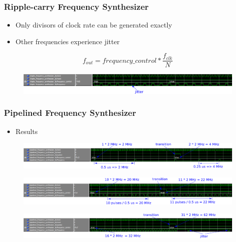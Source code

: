\documentclass{beamer}
\begin{document}
\begin{frame}
\frametitle{Ripple-carry Frequency Synthesizer}

\begin{itemize}
    \item Only divisors of clock rate can be generated exactly
    \item Other frequencies experience jitter
\end{itemize}

\[ f_{out} = frequency\_control * \frac{f_{clk}}{N} \]

\begin{figure}[!htb]
    \centering
    \includegraphics[width=\linewidth]{remainder_jitter.PNG}
\end{figure}

\end{frame}

\begin{frame}
\frametitle{Pipelined Frequency Synthesizer}

\begin{itemize}
    \item Results
\end{itemize}

\begin{figure}[!htb]
    \centering
    \includegraphics[width=\linewidth]{pipeline_2_4_MHz.PNG}
\end{figure}
\begin{figure}[!htb]
    \centering
    \includegraphics[width=\linewidth]{pipeline_20_22_MHz.PNG}
\end{figure}
\begin{figure}[!htb]
    \centering
    \includegraphics[width=\linewidth]{pipeline_32_62_MHz.PNG}
\end{figure}

\end{frame}
\end{document}

